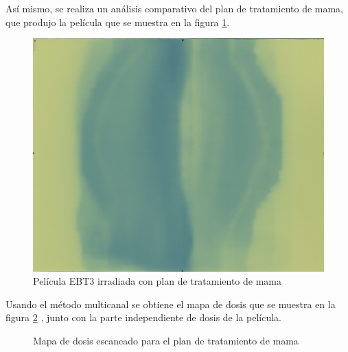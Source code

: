 Así mismo, se realiza un análisis comparativo del plan de tratamiento de mama, que produjo la película que se muestra en la figura \ref{fig:mamaEscaneada}.\\
\begin{figure}[H]
	\centering
	\includegraphics[width=0.7\linewidth]{images/peliculaMama.png}
	\caption{Película EBT3 irradiada con plan de tratamiento de mama }
	\label{fig:mamaEscaneada}
\end{figure}
Usando el método multicanal se obtiene el mapa de dosis que se muestra en la figura \ref{fig:mapaMAma} , junto con la parte independiente de dosis de la película.
\begin{figure}[H]
	\centering
	\hfill
	\caption{Mapa de dosis escaneado para el plan de tratamiento de mama}
	\label{fig:mapaMAma}
\end{figure}

